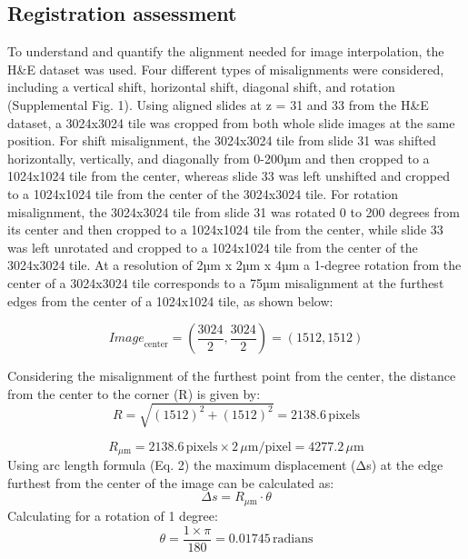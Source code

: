\begin{refsection}
    \subsection{Registration assessment}
    To understand and quantify the alignment needed for image interpolation, the H&E dataset was used. Four different types of misalignments were considered, including a vertical shift, horizontal shift, diagonal shift, and rotation (Supplemental Fig. 1). Using aligned slides at z = 31 and 33 from the H\&E dataset, a 3024x3024 tile was cropped from both whole slide images at the same position. For shift misalignment, the 3024x3024 tile from slide 31 was shifted horizontally, vertically, and diagonally from 0-200µm and then cropped to a 1024x1024 tile from the center, whereas slide 33 was left unshifted and cropped to a 1024x1024 tile from the center of the 3024x3024 tile. For rotation misalignment, the 3024x3024 tile from slide 31 was rotated 0 to 200 degrees from its center and then cropped to a 1024x1024 tile from the center, while slide 33 was left unrotated and cropped to a 1024x1024 tile from the center of the 3024x3024 tile. At a resolution of 2µm x 2µm x 4µm a 1-degree rotation from the center of a 3024x3024 tile corresponds to a 75µm misalignment at the furthest edges from the center of a 1024x1024 tile, as shown below: 
    
    \begin{equation}
    \label{chapter6_img_center}
        \textit{Image}_{\text{center}} = \left( \frac{3024}{2}, \frac{3024}{2} \right) = (1512, 1512)
    \end{equation}
    
    Considering the misalignment of the furthest point from the center, the distance from the center to the corner (R) is given by:
    \begin{equation}
        R = \sqrt{(1512)^2 + (1512)^2} = 2138.6 \, \text{pixels}
    \end{equation}
    
    \begin{equation}
        R_{\mu\text{m}} = 2138.6 \, \text{pixels} \times 2 \, \mu\text{m/pixel} = 4277.2 \, \mu\text{m}
    \end{equation}
    Using arc length formula (Eq. 2) the maximum displacement (Δs) at the edge furthest from the center of the image can be calculated as:
   \begin{equation}
   \label{chapter_6_eq2}
        \Delta s = R_{\mu\text{m}} \cdot \theta \tag{Eq.~2}
    \end{equation}
    Calculating for a rotation of 1 degree:
    \begin{equation}
        \theta = \frac{1 \times \pi}{180} = 0.01745 \, \text{radians}
    \end{equation}
    

\end{refsection}
